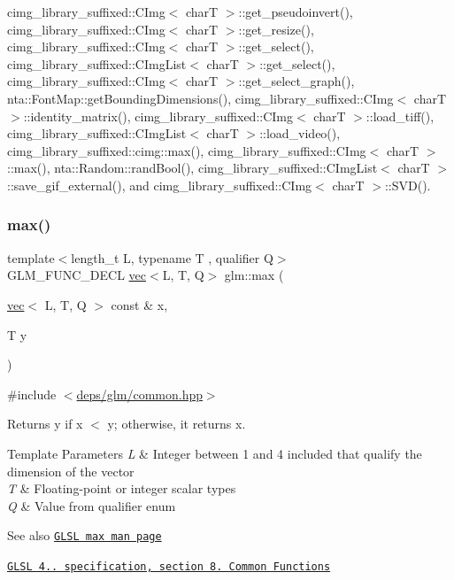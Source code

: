 cimg\+\_\+library\+\_\+suffixed\+::\+C\+Img$<$ char\+T $>$\+::get\+\_\+pseudoinvert(), cimg\+\_\+library\+\_\+suffixed\+::\+C\+Img$<$ char\+T $>$\+::get\+\_\+resize(), cimg\+\_\+library\+\_\+suffixed\+::\+C\+Img$<$ char\+T $>$\+::get\+\_\+select(), cimg\+\_\+library\+\_\+suffixed\+::\+C\+Img\+List$<$ char\+T $>$\+::get\+\_\+select(), cimg\+\_\+library\+\_\+suffixed\+::\+C\+Img$<$ char\+T $>$\+::get\+\_\+select\+\_\+graph(), nta\+::\+Font\+Map\+::get\+Bounding\+Dimensions(), cimg\+\_\+library\+\_\+suffixed\+::\+C\+Img$<$ char\+T $>$\+::identity\+\_\+matrix(), cimg\+\_\+library\+\_\+suffixed\+::\+C\+Img$<$ char\+T $>$\+::load\+\_\+tiff(), cimg\+\_\+library\+\_\+suffixed\+::\+C\+Img\+List$<$ char\+T $>$\+::load\+\_\+video(), cimg\+\_\+library\+\_\+suffixed\+::cimg\+::max(), cimg\+\_\+library\+\_\+suffixed\+::\+C\+Img$<$ char\+T $>$\+::max(), nta\+::\+Random\+::rand\+Bool(), cimg\+\_\+library\+\_\+suffixed\+::\+C\+Img\+List$<$ char\+T $>$\+::save\+\_\+gif\+\_\+external(), and cimg\+\_\+library\+\_\+suffixed\+::\+C\+Img$<$ char\+T $>$\+::\+S\+V\+D().

\mbox{\label{group__core__func__common_gae8b0964d30deabd0867b8d7ac44f067e}} 
\subsubsection{\texorpdfstring{max()}{max()}\hspace{0.1cm}{\footnotesize\ttfamily [2/3]}}
{\footnotesize\ttfamily template$<$length\+\_\+t L, typename T , qualifier Q$>$ \\
G\+L\+M\+\_\+\+F\+U\+N\+C\+\_\+\+D\+E\+CL \hyperlink{structglm_1_1vec}{vec}$<$L, T, Q$>$ glm\+::max (\begin{DoxyParamCaption}\item[{\hyperlink{structglm_1_1vec}{vec}$<$ L, T, Q $>$ const \&}]{x,  }\item[{T}]{y }\end{DoxyParamCaption})}



{\ttfamily \#include $<$\hyperlink{common_8hpp}{deps/glm/common.\+hpp}$>$}

Returns y if x $<$ y; otherwise, it returns x.


\begin{DoxyTemplParams}{Template Parameters}
{\em L} & Integer between 1 and 4 included that qualify the dimension of the vector \\
\hline
{\em T} & Floating-\/point or integer scalar types \\
\hline
{\em Q} & Value from qualifier enum\\
\hline
\end{DoxyTemplParams}
\begin{DoxySeeAlso}{See also}
\href{http://www.opengl.org/sdk/docs/manglsl/xhtml/max.xml}{\tt G\+L\+SL max man page} 

\href{http://www.opengl.org/registry/doc/GLSLangSpec.4.20.8.pdf}{\tt G\+L\+SL 4.. specification, section 8. Common Functions} 
\end{DoxySeeAlso}


